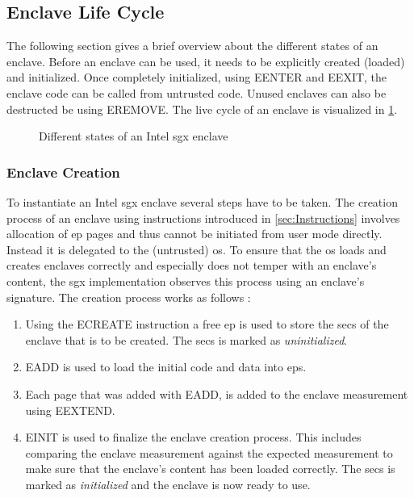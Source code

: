 \subsection{Enclave Life Cycle}
The following section gives a brief overview about the different states of an enclave. Before an enclave can be used, it needs to be explicitly created (loaded) and initialized.
Once completely initialized, using EENTER and EEXIT, the enclave code can be called from untrusted code. Unused enclaves can also be destructed be using EREMOVE. The live cycle 
of an enclave is visualized in \cref{fig:enclaveLifeCycle}.

\begin{figure}[h]
    \centering
    \caption{Different states of an Intel \ac{sgx} enclave \cite{Costan2016IntelSE}}
    \label{fig:enclaveLifeCycle}
\end{figure}

\subsubsection{Enclave Creation}
To instantiate an Intel \ac{sgx} enclave several steps have to be taken. The creation process of an enclave using instructions introduced in \cref{sec:Instructions} involves allocation
of \ac{ep} pages and thus cannot be initiated from user mode directly. Instead it is delegated to the (untrusted) \ac{os}. To ensure that the \ac{os} loads and creates enclaves correctly and
especially does not temper with an enclave's content, the \ac{sgx} implementation observes this process using an enclave's signature. The creation process works as follows
\cite{Costan2016IntelSE}:
\begin{enumerate}
    \item Using the ECREATE instruction a free \ac{ep} is used to store the \ac{secs} of the enclave that is to be created. The \ac{secs} is marked as \textit{uninitialized}.
    \item EADD is used to load the initial code and data into \acp{ep}.
    \item Each page that was added with EADD, is added to the enclave measurement using EEXTEND.
    \item EINIT is used to finalize the enclave creation process. This includes comparing the enclave measurement against the expected measurement to make sure that the enclave's
          content has been loaded correctly. The \ac{secs} is marked as \textit{initialized} and the enclave is now ready to use.
\end{enumerate}

